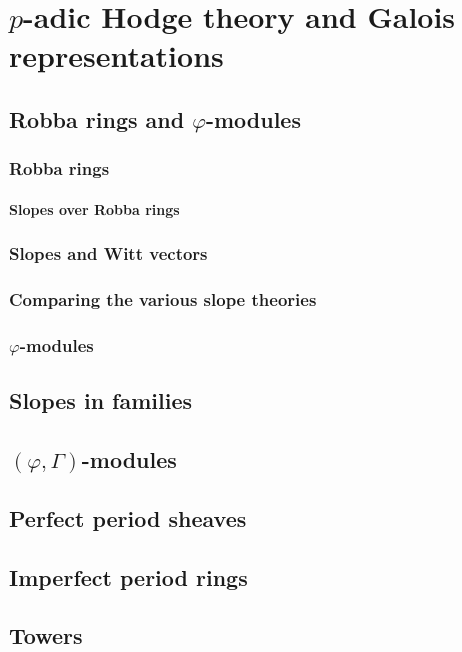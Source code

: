 \chapter{\texorpdfstring{$p$}{}-adic Hodge theory and Galois representations}
    \begin{abstract}
        
    \end{abstract}
    
    \minitoc
    
    \section{Robba rings and \texorpdfstring{$\varphi$}{}-modules}
        \subsection{Robba rings}
            \subsubsection{Slopes over Robba rings}
                
            \subsection{Slopes and Witt vectors}
            
            \subsection{Comparing the various slope theories}
        
        \subsection{\texorpdfstring{$\varphi$}{}-modules}
        
    \section{Slopes in families}
    
    \section{\texorpdfstring{$(\varphi, \Gamma)$}{}-modules}
    
    \section{Perfect period sheaves}
    
    \section{Imperfect period rings}
    
    \section{Towers}